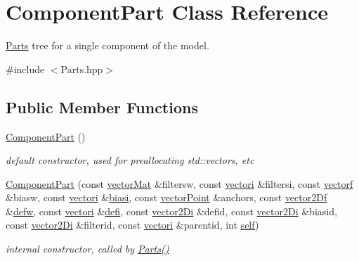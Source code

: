 \hypertarget{classComponentPart}{}\section{Component\+Part Class Reference}
\label{classComponentPart}


\hyperlink{classParts}{Parts} tree for a single component of the model.  




{\ttfamily \#include $<$Parts.\+hpp$>$}

\subsection*{Public Member Functions}
\begin{DoxyCompactItemize}
\item 
\hyperlink{classComponentPart_add8b8160fe16adc84ba35f2ea9434ea1}{Component\+Part} ()
\begin{DoxyCompactList}\small\item\em default constructor, used for preallocating std\+::vectors, etc \end{DoxyCompactList}\item 
\hyperlink{classComponentPart_a922c7a82e491009d996ac41beb947b40}{Component\+Part} (const \hyperlink{types_8hpp_a3207a7addcfa415d1c83622febcb1e9b}{vector\+Mat} \&filtersw, const \hyperlink{types_8hpp_a44529587d60e73bf0e689a82e5e70a55}{vectori} \&filtersi, const \hyperlink{types_8hpp_a4da5db3ee9e284f719ef5764dbadffc8}{vectorf} \&biasw, const \hyperlink{types_8hpp_a44529587d60e73bf0e689a82e5e70a55}{vectori} \&\hyperlink{classComponentPart_a8c5fde49dae3ab679454a106a9e41be8}{biasi}, const \hyperlink{types_8hpp_ac468fcf6870d6563ac8fa3669845afcc}{vector\+Point} \&anchors, const \hyperlink{types_8hpp_a94f2d563f3725231a6f684b4dce4f1ef}{vector2\+Df} \&\hyperlink{classComponentPart_a9dfb0fd739381be92d5ce2eab5054681}{defw}, const \hyperlink{types_8hpp_a44529587d60e73bf0e689a82e5e70a55}{vectori} \&\hyperlink{classComponentPart_ae1d71f86350d8757e33bbeb1af85f4fa}{defi}, const \hyperlink{types_8hpp_a93a5e2cfd40d1ff1f10d8bbf11884c41}{vector2\+Di} \&defid, const \hyperlink{types_8hpp_a93a5e2cfd40d1ff1f10d8bbf11884c41}{vector2\+Di} \&biasid, const \hyperlink{types_8hpp_a93a5e2cfd40d1ff1f10d8bbf11884c41}{vector2\+Di} \&filterid, const \hyperlink{types_8hpp_a44529587d60e73bf0e689a82e5e70a55}{vectori} \&parentid, int \hyperlink{classComponentPart_abe27079725188a3cb881459a6ba0abc5}{self})
\begin{DoxyCompactList}\small\item\em internal constructor, called by \hyperlink{classParts}{Parts()} \end{DoxyCompactList}\item 

\end{DoxyCompactItemize}
